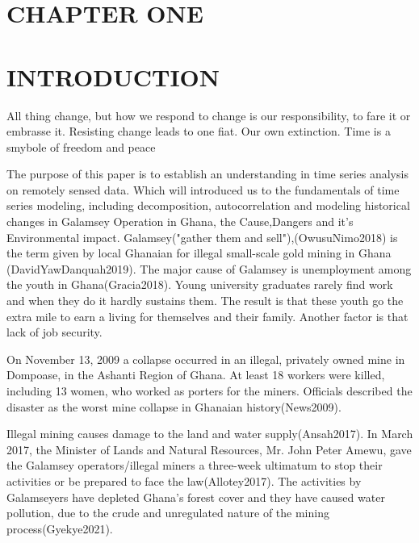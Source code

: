 \documentclass[12pt,a4paper]{article}
\begin{document}
	\tableofcontents
	\begin{flushleft}
		\section{CHAPTER ONE}
		  \section{INTRODUCTION}
		  All thing change, but how we respond to change is our responsibility, to  fare it or embrasse it. Resisting change leads to one fiat. Our own extinction. Time is a smybole of freedom and peace
		  
		  The purpose of this paper is to establish an understanding in time series analysis on remotely sensed data. Which will introduced us to the fundamentals of time series modeling, including decomposition, autocorrelation and modeling historical changes in Galamsey Operation in Ghana, the Cause,Dangers and it’s Environmental impact.
		  Galamsey("gather them and sell"),(OwusuNimo2018) is the term given by local Ghanaian for illegal small-scale gold mining in Ghana (DavidYawDanquah2019). The major cause of Galamsey is unemployment among the youth in Ghana(Gracia2018). Young university graduates rarely find work and when they do it hardly sustains them. The result is that these youth go the extra mile to earn a living for themselves and their family.
		  Another factor is that lack of job security.
		  
		  On November 13, 2009 a collapse occurred in an illegal, privately owned mine in Dompoase, in the Ashanti Region of Ghana. At least 18 workers were killed, including 13 women, who worked as porters for the miners. Officials described the disaster as the worst mine collapse in Ghanaian history(News2009).
		  
		  Illegal mining causes damage to the land and water supply(Ansah2017). In March 2017, the Minister of Lands and Natural Resources, Mr. John Peter Amewu, gave the Galamsey operators/illegal miners a three-week ultimatum to stop their activities or be prepared to face the law(Allotey2017). The activities by Galamseyers have depleted Ghana’s forest cover and they have caused water pollution, due to the crude and unregulated nature of the mining process(Gyekye2021).
		  

\end{flushleft}
\end{document}
